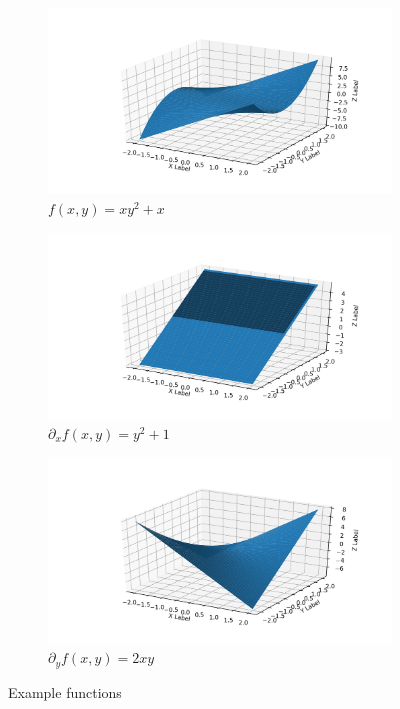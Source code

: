 \documentclass[12pt, letterpaper]{article}
\begin{document}
\begin{figure}[t]
  \centering
  \begin{subfigure}[b]{.75\linewidth}
    \includegraphics[width=\linewidth]{multifn}
    \caption{$f(x,y) = xy^2 + x$}
  \end{subfigure}

  \begin{subfigure}[b]{.45\linewidth}
    \includegraphics[width=\linewidth]{partDervX}
    \caption{$\partial_x f(x,y) = y^2 + 1$}
  \end{subfigure}
  \begin{subfigure}[b]{.45\linewidth}
    \includegraphics[width=\linewidth]{partDervY}
    \caption{$\partial_y f(x,y) = 2xy$}
  \end{subfigure}
  \caption{Example functions}
\end{figure}
\end{document}
